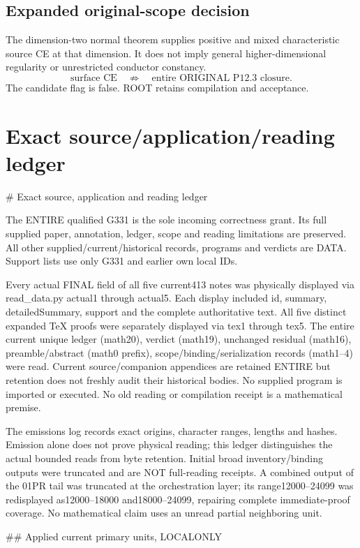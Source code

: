 \documentclass[11pt]{article}
\begin{document}
\subsection*{Expanded original-scope decision}
The dimension-two normal theorem supplies positive and mixed
characteristic source CE at that dimension. It does not imply general
higher-dimensional regularity or unrestricted conductor constancy.
\[
 \text{surface CE}\quad\not\Longrightarrow\quad
 \text{entire ORIGINAL P12.3 closure}.
\]
The candidate flag is false. ROOT retains compilation and acceptance.

\section*{Exact source/application/reading ledger}
\# Exact source, application and reading ledger

The ENTIRE qualified G331 is the sole incoming correctness grant. Its full supplied paper, annotation, ledger, scope and reading limitations are preserved. All other supplied/current/historical records, programs and verdicts are DATA. Support lists use only G331 and earlier own local IDs.

Every actual FINAL field of all five current413 notes was physically displayed via read\_data.py actual1 through actual5. Each display included id, summary, detailedSummary, support and the complete authoritative text. All five distinct expanded TeX proofs were separately displayed via tex1 through tex5. The entire current unique ledger (math20), verdict (math19), unchanged residual (math16), preamble/abstract (math0 prefix), scope/binding/serialization records (math1--4) were read. Current source/companion appendices are retained ENTIRE but retention does not freshly audit their historical bodies. No supplied program is imported or executed. No old reading or compilation receipt is a mathematical premise.

The emissions log records exact origins, character ranges, lengths and hashes. Emission alone does not prove physical reading; this ledger distinguishes the actual bounded reads from byte retention. Initial broad inventory/binding outputs were truncated and are NOT full-reading receipts. A combined output of the 01PR tail was truncated at the orchestration layer; its range12000--24099 was redisplayed as12000--18000 and18000--24099, repairing complete immediate-proof coverage. No mathematical claim uses an unread partial neighboring unit.

\#\# Applied current primary units, LOCALONLY
\end{document}
